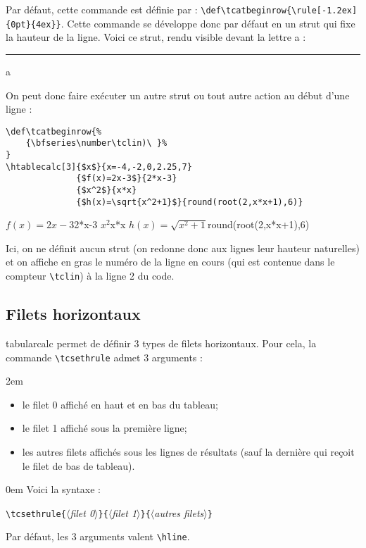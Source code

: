 \documentclass[a4paper,10pt]{article}
\newcommand\guill[1]{\og{}#1\fg{}}
\newcommand\argu[1]{$\langle$\textit{#1}$\rangle$}
\newcommand\ARGU[1]{\texttt{\{}\argu{#1}\texttt{\}}}
\newcommand\tbcalc{\textsf{tabularcalc}\xspace}
\newcommand\verbinline{\lstinline[breaklines=false,basicstyle=\normalsize\ttfamily]}
\newcommand\mywidth{0.85\linewidth}
\begin{document}
Par défaut, cette commande est définie par : \verbinline|\def\tcatbeginrow{\rule[-1.2ex]{0pt}{4ex}}|. Cette commande se développe donc par défaut en un \guill{strut} qui fixe la hauteur de la ligne. Voici ce strut, rendu visible devant la lettre a : \rule[-1.2ex]{2pt}{4ex}a\medskip

On peut donc faire exécuter un autre strut ou tout autre action au début d'une ligne :
\begin{center}
\begin{minipage}{\mywidth}
\begin{lstlisting}
\def\tcatbeginrow{%
	{\bfseries\number\tclin)\ }%
}
\htablecalc[3]{$x$}{x=-4,-2,0,2.25,7}
              {$f(x)=2x-3$}{2*x-3}
              {$x^2$}{x*x}
              {$h(x)=\sqrt{x^2+1}$}{round(root(2,x*x+1),6)}
\end{lstlisting}
\end{minipage}

\def\tcatbeginrow{%
	{\bfseries\number\tclin)\ }%
}
              {$f(x)=2x-3$}{2*x-3}
              {$x^2$}{x*x}
              {$h(x)=\sqrt{x^2+1}$}{round(root(2,x*x+1),6)}
\end{center}
Ici, on ne définit aucun strut (on redonne donc aux lignes leur hauteur naturelles) et on affiche en gras le numéro de la ligne en cours (qui est contenue dans le compteur \verbinline|\tclin|) à la ligne 2 du code.

\subsection{Filets horizontaux}
\tbcalc permet de définir 3 types de filets horizontaux. Pour cela, la commande \verbinline|\tcsethrule| admet 3 arguments :

\parindent2em
\begin{itemize}
	\item le \guill{filet 0} affiché en haut et en bas du tableau;
	\item le \guill{filet 1} affiché sous la première ligne;
	\item les \guill{autres filets} affichés sous les lignes de résultats (sauf la dernière qui reçoit le filet de bas de tableau).
\end{itemize}\parindent0em
Voici la syntaxe :

\verbinline|\tcsethrule|\ARGU{filet 0}\ARGU{filet 1}\ARGU{autres filets}
\medskip

Par défaut, les 3 arguments valent \verbinline|\hline|.\medskip
\end{document}
